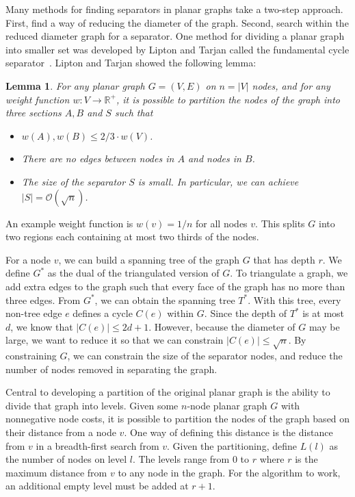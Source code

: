 \documentclass[11pt]{article}
\newtheorem{lemma}[theorem]{Lemma}
\begin{document}
Many methods for finding separators in planar graphs take a two-step approach. First, find a way of reducing the diameter of the graph. Second, search within the reduced diameter graph for a separator. One method for dividing a planar graph into smaller set was developed by Lipton and Tarjan called the fundamental cycle separator~\cite{lipton1979separator}. Lipton and Tarjan showed the following lemma: \\

\begin{lemma}
    \label{lemma:separator}
    For any planar graph $G = (V,E)$ on $n = |V|$ nodes, and for any weight function $w: V \rightarrow \mathbb{R}^+$, it is possible to partition the nodes of the graph into three sections $A, B$ and $S$ such that
    \begin{itemize}
        \item $w(A), w(B) \leq 2/3 \cdot w(V)$. 

        \item There are no edges between nodes in $A$ and nodes in $B$.

        \item The size of the separator $S$ is small. In particular, we can achieve $|S| = \mathcal{O}(\sqrt{n})$.
    \end{itemize}
\end{lemma}

An example weight function is $w(v) = 1/n$ for all nodes $v$. This splits $G$ into two regions each containing at most two thirds of the nodes.

For a node $v$, we can build a spanning tree of the graph $G$ that has depth $r$. We define $G^*$ as the dual of the triangulated version of $G$. To triangulate a graph, we add extra edges to the graph such that every face of the graph has no more than three edges. From $G^*$, we can obtain the spanning tree $T^*$. With this tree, every non-tree edge $e$ defines a cycle $C(e)$ within $G$. Since the depth of $T^*$ is at most $d$, we know that $|C(e)| \leq 2d + 1$. However, because the diameter of $G$ may be large, we want to reduce it so that we can constrain $|C(e)| \leq \sqrt{n}$. By constraining $G$, we can constrain the size of the separator nodes, and reduce the number of nodes removed in separating the graph.

Central to developing a partition of the original planar graph is the ability to divide that graph into levels. Given some $n$-node planar graph $G$ with nonnegative node costs, it is possible to partition the nodes of the graph based on their distance from a node $v$. One way of defining this distance is the distance from $v$ in a breadth-first search from $v$. Given the partitioning, define $L(l)$ as the number of nodes on level $l$. The levels range from $0$ to $r$ where $r$ is the maximum distance from $v$ to any node in the graph. For the algorithm to work, an additional empty level must be added at $r+1$.
\end{document}
